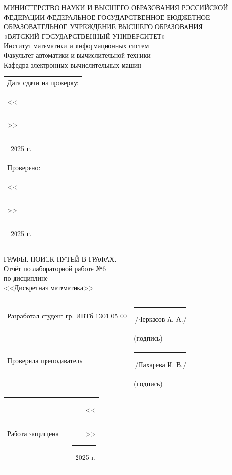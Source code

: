 \documentclass[oneside,a4paper,14pt]{extarticle}
\begin{document}
\newpage
\thispagestyle{empty}
\begin{center}
	МИНИСТЕРСТВО НАУКИ И ВЫСШЕГО ОБРАЗОВАНИЯ РОССИЙСКОЙ ФЕДЕРАЦИИ ФЕДЕРАЛЬНОЕ ГОСУДАРСТВЕННОЕ БЮДЖЕТНОЕ ОБРАЗОВАТЕЛЬНОЕ УЧРЕЖДЕНИЕ ВЫСШЕГО ОБРАЗОВАНИЯ\\
	«ВЯТСКИЙ ГОСУДАРСТВЕННЫЙ УНИВЕРСИТЕТ»\\
	Институт математики и информационных систем\\
	Факультет автоматики и вычислительной техники\\
	Кафедра электронных вычислительных машин
\end{center}
\vspace{10mm}

\hfill
\begin{tabular}{l}
  \footnotesize Дата сдачи на проверку: \\
  \footnotesize <<\rule[-1mm]{5mm}{0.10mm}\/>>\rule[-1mm]{20mm}{0.10mm}\ 2025 г.\\
  \footnotesize Проверено: \\
  \footnotesize <<\rule[-1mm]{5mm}{0.10mm}\/>>\rule[-1mm]{20mm}{0.10mm}\ 2025 г. \\
\end{tabular}
\vfill

\begin{center}
  ГРАФЫ. ПОИСК ПУТЕЙ В ГРАФАХ.\\
	Отчёт по лабораторной работе №6\\
	по дисциплине\\
	<<Дискретная математика>>\\
\end{center}
\vspace{25mm}
\noindent
\begin{tabular}{ll}
	Разработал студент гр. ИВТб-1301-05-00 & \rule[-1mm]{30mm}{0.10mm}\,/Черкасов А. А./   \\
	                                       & \hspace{8mm}\footnotesize(подпись)            \\
	Проверила преподаватель                & \rule[-1mm]{30mm}{0.10mm}\,/Пахарева И. В./ \\
	                                       & \hspace{8mm}\footnotesize(подпись)            \\
\end{tabular}

\noindent
  \begin{tabular}{lp{58mm}r}
    Работа защищена &  & <<\rule[-1mm]{5mm}{0.10mm}\/>>\rule[-1mm]{30mm}{0.10mm}\ 2025 г.
  \end{tabular}
  \vfill
\end{document}
